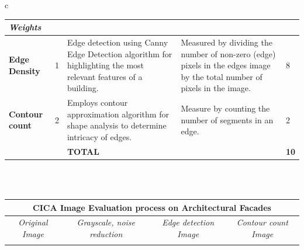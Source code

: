 \documentclass[final,5p,times]{elsarticle}
\begin{document}
\begin{table}[!htb]
\begin{tabular}{c}
\begin{minipage}{\textwidth}
\begin{tabularx}{\textwidth}{p{2.5cm} p{1cm} X X p{1cm}}
              \textit{Weights} \\ \midrule
            \textbf{Edge Density} &
              1 &
              Edge detection using Canny Edge Detection algorithm for highlighting the most relevant features of a building.
                &
              Measured by dividing the number of non-zero (edge) pixels in the edges image by the total number of pixels in the image.
                &
              8\\
            \textbf{Contour count} &
              2 &
              Employs contour approximation algorithm for shape analysis to determine intricacy of edges.
                &
              Measure by counting the number of segments in an edge.
                &
              2\\ \bottomrule
               &
               &
              \textbf{TOTAL} &
              &
              \textbf{10}\\ \bottomrule
        \end{tabularx}
    \end{minipage}
    \\
    \\
    \begin{minipage}{\textwidth}
        \centering
        \label{tab:CICAPlotMaster}
        \begin{tabularx}
        {\textwidth}{X X X X }
            \toprule
            \multicolumn{4}{c}{\textbf{CICA Image Evaluation process on Architectural Facades}} \\
            \toprule
            \multicolumn{1}{c}{\textit{Original Image}} &
             \multicolumn{1}{c}{\textit{Grayscale, noise reduction}} &
            \multicolumn{1}{c}{\textit{Edge detection Image}} &
            \multicolumn{1}{c}{\textit{Contour count Image}}\\
            \midrule
            \text{(a) 3D-modeled facades} &  &  &
            \\

\end{tabularx}
\end{minipage}
\end{tabular}
\end{table}
\end{document}
